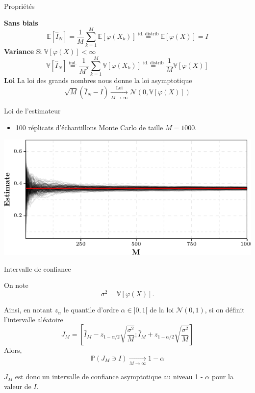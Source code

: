\documentclass[ignorenonframetext,]{beamer}
\providecommand{\tightlist}{%
  \setlength{\itemsep}{0pt}\setlength{\parskip}{0pt}}
\begin{document}
\begin{frame}{Propriétés}
\protect\hypertarget{propriuxe9tuxe9s}{}

\textbf{Sans biais}
\[\mathbb{E}[\hat{I}_N] = \frac{1}{M}\sum_{k = 1}^M \mathbb{E}[\varphi(X_k)] \overset{\text{id. distrib}}{=} \mathbb{E}[\varphi(X)] = I\]
\pause \textbf{Variance} Si \(\mathbb{V}[\varphi(X)] < \infty\)
\[\mathbb{V}[\hat{I}_N] \overset{\text{ind.}}{=} \frac{1}{M^2}\sum_{k = 1}^M \mathbb{V}[\varphi(X_k)] \overset{\text{id. distrib}}{=} \frac{1}{M} \mathbb{V}[\varphi(X)]\]
\pause \textbf{Loi} La loi des grands nombres nous donne la loi
asymptotique
\[\sqrt{M}\left(\hat{I}_N - I \right) \underset{M\rightarrow\infty}{\overset{\text{Loi}}{\longrightarrow}} \mathcal{N}(0, \mathbb{V}[\varphi(X)])\]

\end{frame}

\begin{frame}{Loi de l'estimateur}
\protect\hypertarget{loi-de-lestimateur}{}

\begin{itemize}
\tightlist
\item
  100 réplicats d'échantillons Monte Carlo de taille \(M = 1000\).
\end{itemize}

\includegraphics{diapos_monte_carlo_files/figure-beamer/plot_all_estimates-1.pdf}

\end{frame}

\begin{frame}{Intervalle de confiance}
\protect\hypertarget{intervalle-de-confiance}{}

On note \[\sigma^2 = \mathbb{V}[\varphi(X)].\]

Ainsi, en notant \(z_{\alpha}\) le quantile d'ordre \(\alpha \in]0, 1[\)
de la loi \(\mathcal{N} (0, 1)\), si on définit l'intervalle aléatoire
\[J_M = \left[\hat{I}_M - z_{1 - \alpha/2}\sqrt{\frac{\sigma^2}{M}}; \hat{I}_M + z_{1 - \alpha/2}\sqrt{\frac{\sigma^2}{M}}\right]\]
Alors,
\[\mathbb{P}(J_M \ni I) \underset{M\rightarrow \infty}{\longrightarrow} 1-\alpha\]

\(J_M\) est donc un intervalle de confiance asymptotique au niveau 1 -
\(\alpha\) pour la valeur de \(I\).

\end{frame}
\end{document}
